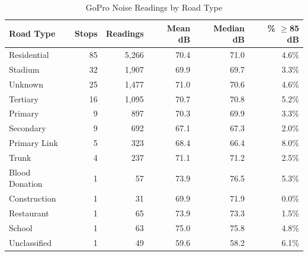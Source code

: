 \begin{table}[htbp]
\centering
\caption{GoPro Noise Readings by Road Type}
\label{tab:gopro_road_type}
\begin{tabular}{lrrrrr}
\toprule
Road Type & Stops & Readings & Mean dB & Median dB & \% $\geq$85 dB \\
\midrule
Residential & 85 & 5,266 & 70.4 & 71.0 & 4.6\% \\
Stadium & 32 & 1,907 & 69.9 & 69.7 & 3.3\% \\
Unknown & 25 & 1,477 & 71.0 & 70.6 & 4.6\% \\
Tertiary & 16 & 1,095 & 70.7 & 70.8 & 5.2\% \\
Primary & 9 & 897 & 70.3 & 69.9 & 3.3\% \\
Secondary & 9 & 692 & 67.1 & 67.3 & 2.0\% \\
Primary Link & 5 & 323 & 68.4 & 66.4 & 8.0\% \\
Trunk & 4 & 237 & 71.1 & 71.2 & 2.5\% \\
Blood Donation & 1 & 57 & 73.9 & 76.5 & 5.3\% \\
Construction & 1 & 31 & 69.9 & 71.9 & 0.0\% \\
Restaurant & 1 & 65 & 73.9 & 73.3 & 1.5\% \\
School & 1 & 63 & 75.0 & 75.8 & 4.8\% \\
Unclassified & 1 & 49 & 59.6 & 58.2 & 6.1\% \\
\bottomrule
\end{tabular}
\end{table}
